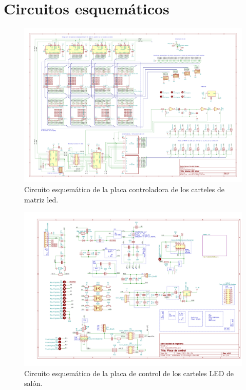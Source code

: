
\chapter{Circuitos esquemáticos} %

\label{AppendixA} %
\pagebreak
\newpage
\begin{figure}[H]
	\centering
	\includegraphics[width=1.66\textwidth, angle=90]{./Figures/output.driverled.pdf}
	\caption{Circuito esquemático de la placa controladora de los carteles de matriz led.}
	\label{fig:schDriverled}
\end{figure}

\begin{figure}[H]
	\centering
	\includegraphics[width=1.66\textwidth, angle=90]{./Figures/output.placaControl.pdf}
	\caption{Circuito esquemático de la placa de control de los carteles LED de salón.}
	\label{fig:schController}
\end{figure}